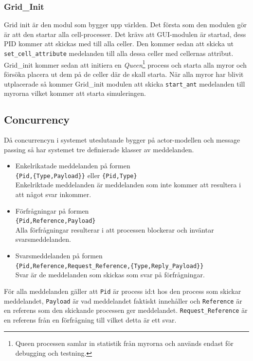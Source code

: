 \documentclass[12pt]{article}
\begin{document}
\subsubsection{Grid\_Init}
Grid init är den modul som bygger upp världen.
Det första som den modulen gör är att den startar alla cell-processer.
Det krävs att GUI-modulen är startad,
dess PID kommer att skickas med till alla celler.
Den kommer sedan att skicka ut \texttt{set\_cell\_attribute} medelanden till alla dessa celler med cellernas attribut.
Grid\_init kommer sedan att initiera en \textit{Queen}\footnote{Queen processen samlar in statistik från myrorna och används endast för debugging och testning.} process och starta alla myror och försöka placera ut dem på de celler där de skall starta.
När alla myror har blivit utplacerade så kommer Grid\_init modulen att skicka \texttt{start\_ant} medelanden till myrorna vilket kommer att starta simuleringen.

\subsection{Concurrency}
Då concurrencyn i systemet uteslutande bygger på actor-modellen och message passing så har systemet tre definierade klasser av meddelanden.

\begin{itemize}
    \item Enkelrikatade meddelanden på formen \\
    \texttt{\{Pid,\{Type,Payload\}\}} eller \texttt{\{Pid,Type\}} \\
    Enkelriktade meddelanden är meddelanden som inte kommer att resultera i att något svar inkommer.
    \item Förfrågningar på formen \\
    \texttt{\{Pid,Reference,Payload\}} \\
    Alla förfrågningar resulterar i att processen blockerar och inväntar svarsmeddelanden.
    \item Svarsmeddelanden på formen \\
    \texttt{\{Pid,Reference,Request\_Reference,\{Type,Reply\_Payload\}\}} \\
    Svar är de meddelanden som skickas som svar på förfrågningar.
\end{itemize}

För alla meddelanden gäller att \texttt{Pid} är process id:t hos den process som skickar meddelandet,
\texttt{Payload} är vad meddelandet faktiskt innehåller och \texttt{Reference} är en referens som den skickande processen ger meddelandet.
\texttt{Request\_Reference} är en referens från en förfrågning till vilket detta är ett svar.
\end{document}
